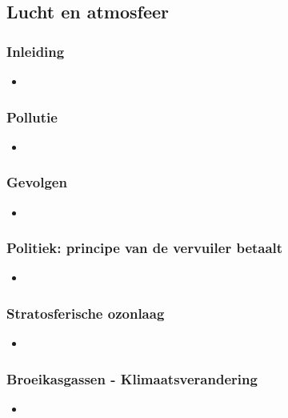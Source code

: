 \documentclass[12pt]{article}
\begin{document}
    \subsection{Lucht en atmosfeer}
    \subsubsection*{Inleiding}
    \begin{itemize}
        \item 
    \end{itemize}

    \subsubsection*{Pollutie}
    \begin{itemize}
        \item 
    \end{itemize}

    \subsubsection*{Gevolgen}
    \begin{itemize}
        \item 
    \end{itemize}

    \subsubsection*{Politiek: principe van de vervuiler betaalt}
    \begin{itemize}
        \item 
    \end{itemize}

    \subsubsection*{Stratosferische ozonlaag}
    \begin{itemize}
        \item 
    \end{itemize}

    \subsubsection*{Broeikasgassen - Klimaatsverandering}
    \begin{itemize}
        \item 
    \end{itemize}
\end{document}
